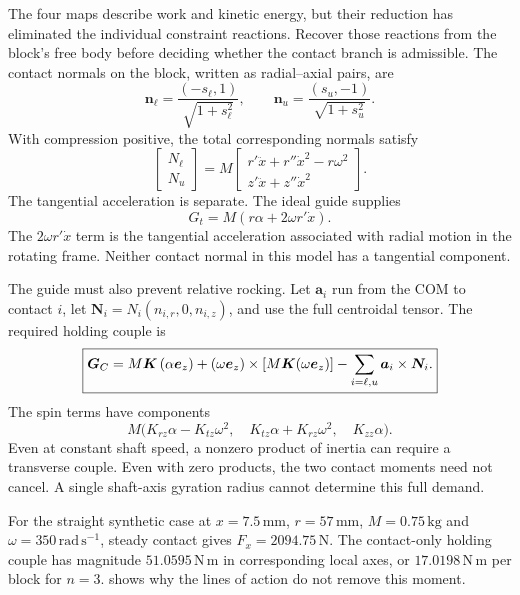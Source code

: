 \documentclass[11pt,letterpaper]{article}
\numberwithin{equation}{section}
\begin{document}
The four maps describe work and kinetic energy, but their reduction has
eliminated the individual constraint reactions. Recover those reactions from
the block's free body before deciding whether the contact branch is admissible.
The contact normals on the block, written as radial--axial pairs, are
\begin{equation}
 \bm n_\ell=\frac{(-s_\ell,1)}{\sqrt{1+s_\ell^2}},\qquad
 \bm n_u=\frac{(s_u,-1)}{\sqrt{1+s_u^2}}.
\end{equation}
With compression positive, the total corresponding normals satisfy
\begin{equation}
 [\bm n_\ell\ \bm n_u]
 \begin{bmatrix}N_\ell\\N_u\end{bmatrix}
 =M\begin{bmatrix}
 r'\ddot x+r''\dot x^2-r\omega^2\\
 z'\ddot x+z''\dot x^2
 \end{bmatrix}.
 \label{eq:normals}
\end{equation}
The tangential acceleration is separate. The ideal guide supplies
\begin{equation}
 G_t=M(r\alpha+2\omega r'\dot x).
 \label{eq:guide-force}
\end{equation}
The $2\omega r'\dot x$ term is the tangential acceleration associated with
radial motion in the rotating frame. Neither contact normal in this model has
a tangential component.

The guide must also prevent relative rocking. Let $\bm a_i$ run from the COM
to contact $i$, let $\bm N_i=N_i(n_{i,r},0,n_{i,z})$, and use the full
centroidal tensor. The required holding couple is
\begin{equation}
 \boxed{\bm G_C=M\bm K\,(\alpha\bm e_z)
       +(\omega\bm e_z)\times[M\bm K(\omega\bm e_z)]
       -\sum_{i=\ell,u}\bm a_i\times\bm N_i.}
 \label{eq:guide-moment}
\end{equation}
The spin terms have components
\begin{equation}
 M\bigl(K_{rz}\alpha-K_{tz}\omega^2,\quad
        K_{tz}\alpha+K_{rz}\omega^2,\quad K_{zz}\alpha\bigr).
\end{equation}
Even at constant shaft speed, a nonzero product of inertia can require a
transverse couple. Even with zero products, the two contact moments need not
cancel. A single shaft-axis gyration radius cannot determine this full demand.

For the straight synthetic case at $x=7.5\,\mathrm{mm}$,
$r=57\,\mathrm{mm}$, $M=0.75\,\mathrm{kg}$ and
$\omega=350\,\mathrm{rad\,s^{-1}}$, steady contact gives
$F_x=2094.75\,\mathrm N$. The contact-only holding couple has magnitude
$51.0595\,\mathrm{N\,m}$ in corresponding local axes, or
$17.0198\,\mathrm{N\,m}$ per block for $n=3$.
 shows why the lines of action do not remove this moment.
\end{document}
